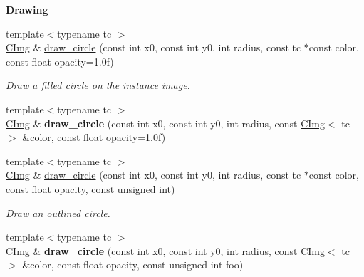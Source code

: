 \begin{Indent}{\bf Drawing}
\begin{DoxyCompactItemize}
\item 
{\footnotesize template$<$typename tc $>$ }\\\hyperlink{structcimg__library_1_1_c_img}{C\-Img} \& \hyperlink{structcimg__library_1_1_c_img_a8328a10f9e96fd585d2a032b03e9e781}{draw\-\_\-circle} (const int x0, const int y0, int radius, const tc $\ast$const color, const float opacity=1.\-0f)
\begin{DoxyCompactList}\small\item\em Draw a filled circle on the instance image. \end{DoxyCompactList}\item 
\hypertarget{structcimg__library_1_1_c_img_abb63e499559bc40456959b86062c3a56}{{\footnotesize template$<$typename tc $>$ }\\\hyperlink{structcimg__library_1_1_c_img}{C\-Img} \& {\bfseries draw\-\_\-circle} (const int x0, const int y0, int radius, const \hyperlink{structcimg__library_1_1_c_img}{C\-Img}$<$ tc $>$ \&color, const float opacity=1.\-0f)}\label{structcimg__library_1_1_c_img_abb63e499559bc40456959b86062c3a56}

\item 
{\footnotesize template$<$typename tc $>$ }\\\hyperlink{structcimg__library_1_1_c_img}{C\-Img} \& \hyperlink{structcimg__library_1_1_c_img_a9c7293be611e6c79c51758bcbcbb8802}{draw\-\_\-circle} (const int x0, const int y0, int radius, const tc $\ast$const color, const float opacity, const unsigned int)
\begin{DoxyCompactList}\small\item\em Draw an outlined circle. \end{DoxyCompactList}\item 
\hypertarget{structcimg__library_1_1_c_img_ae585011752c28dbe1ced5440dd74e059}{{\footnotesize template$<$typename tc $>$ }\\\hyperlink{structcimg__library_1_1_c_img}{C\-Img} \& {\bfseries draw\-\_\-circle} (const int x0, const int y0, int radius, const \hyperlink{structcimg__library_1_1_c_img}{C\-Img}$<$ tc $>$ \&color, const float opacity, const unsigned int foo)}\label{structcimg__library_1_1_c_img_ae585011752c28dbe1ced5440dd74e059}


\end{DoxyCompactItemize}
\end{Indent}
